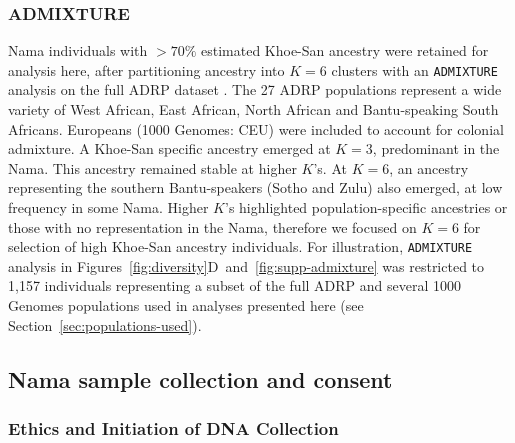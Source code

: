 \documentclass[]{article}
\begin{document}
\subsubsection{ADMIXTURE} Nama individuals with $>70\%$ estimated Khoe-San
ancestry were retained for analysis here, after partitioning ancestry into $K =
6$ clusters with an \texttt{ADMIXTURE} \citep{Alexander2009-sw} analysis on the
full ADRP dataset \citep{Van_Eeden2022-od}. The 27 ADRP populations represent a
wide variety of West African, East African, North African and Bantu-speaking
South Africans. Europeans (1000 Genomes: CEU) were included to account for
colonial admixture. A Khoe-San specific ancestry emerged at $K = 3$,
predominant in the Nama. This ancestry remained stable at higher $K$'s. At $K =
6$, an ancestry representing the southern Bantu-speakers (Sotho and Zulu) also
emerged, at low frequency in some Nama. Higher $K$'s highlighted
population-specific ancestries or those with no representation in the Nama,
therefore we focused on $K = 6$ for selection of high Khoe-San ancestry
individuals. For illustration, \texttt{ADMIXTURE} analysis in
Figures~\ref{fig:diversity}D~and~\ref{fig:supp-admixture} was restricted to
1,157 individuals representing a subset of the full ADRP and several 1000
Genomes populations used in analyses presented here (see
Section~\ref{sec:populations-used}).

\subsection{Nama sample collection and consent}

\subsubsection{Ethics and Initiation of DNA Collection}
\end{document}
